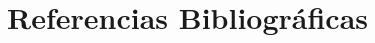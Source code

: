 
\chapter*{Referencias Bibliogr\'aficas}

\noindent

\noindent

\noindent

\noindent

\noindent

\noindent

\noindent

\noindent

